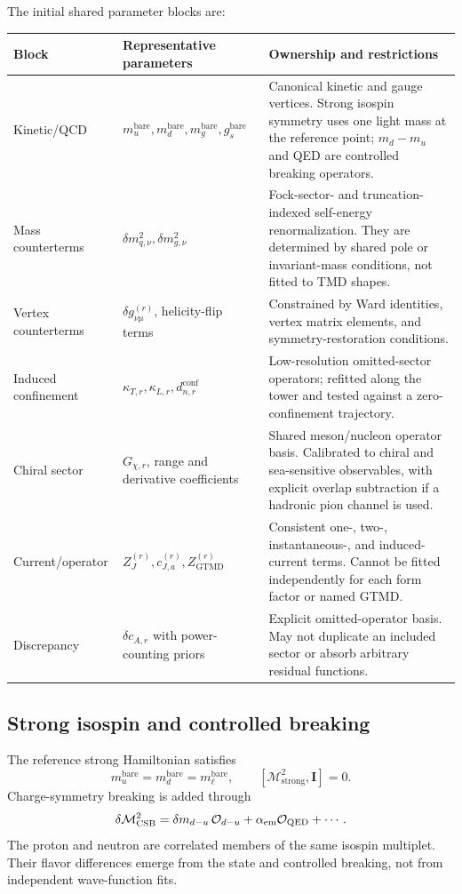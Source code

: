 \documentclass[11pt]{article}
\newcommand{\GTMD}{\ensuremath{\mathrm{GTMD}}}
\newcommand{\cO}{\mathcal O}
\newcommand{\cM}{\mathcal M}
\newcommand{\bare}{\mathrm{bare}}
\newcommand{\conf}{\mathrm{conf}}
\begin{document}
The initial shared parameter blocks are:
\begin{longtable}{L{0.22\textwidth}L{0.28\textwidth}L{0.42\textwidth}}
\toprule
Block & Representative parameters & Ownership and restrictions\\
\midrule
\endhead
Kinetic/QCD & \(m_{u}^{\bare},m_d^{\bare},m_g^{\bare},g_s^{\bare}\) &
Canonical kinetic and gauge vertices.  Strong isospin symmetry uses one light
mass at the reference point; \(m_d-m_u\) and QED are controlled breaking
operators.\\
Mass counterterms & \(\delta m_{q,\nu}^{2},\delta m_{g,\nu}^{2}\) &
Fock-sector- and truncation-indexed self-energy renormalization.  They are
determined by shared pole or invariant-mass conditions, not fitted to TMD
shapes.\\
Vertex counterterms & \(\delta g_{\nu\mu}^{(r)}\), helicity-flip terms &
Constrained by Ward identities, vertex matrix elements, and symmetry-restoration
conditions.\\
Induced confinement & \(\kappa_{T,r},\kappa_{L,r},d_{n,r}^{\conf}\) &
Low-resolution omitted-sector operators; refitted along the tower and tested
against a zero-confinement trajectory.\\
Chiral sector & \(G_{\chi,r}\), range and derivative coefficients &
Shared meson/nucleon operator basis.  Calibrated to chiral and sea-sensitive
observables, with explicit overlap subtraction if a hadronic pion channel is
used.\\
Current/operator & \(Z_J^{(r)},c_{J,a}^{(r)},Z_{\GTMD}^{(r)}\) &
Consistent one-, two-, instantaneous-, and induced-current terms.  Cannot be
fitted independently for each form factor or named GTMD.\\
Discrepancy & \(\delta c_{A,r}\) with power-counting priors &
Explicit omitted-operator basis.  May not duplicate an included sector or
absorb arbitrary residual functions.\\
\bottomrule
\end{longtable}

\subsection{Strong isospin and controlled breaking}

The reference strong Hamiltonian satisfies
\begin{equation}
 m_u^{\bare}=m_d^{\bare}=m_\ell^{\bare},
 \qquad
 [\cM_{\mathrm{strong}}^{2},\bm I]=0.
 \label{eq:isospin-reference}
\end{equation}
Charge-symmetry breaking is added through
\begin{equation}
 \delta\cM_{\rm CSB}^{2}
 =\delta m_{d-u}\,\cO_{d-u}
 +\alpha_{\rm em}\cO_{\rm QED}
 +\cdots.
 \label{eq:csb-operators}
\end{equation}
The proton and neutron are correlated members of the same isospin multiplet.
Their flavor differences emerge from the state and controlled breaking, not
from independent wave-function fits.
\end{document}
